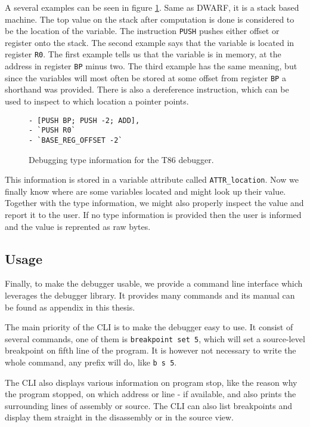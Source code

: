 A several examples can be seen in figure \ref{fig:t86dbg-vm}. Same as DWARF, it
is a stack based machine. The top value on the stack after computation is done
is considered to be the location of the variable. The instruction \texttt{PUSH}
pushes either offset or register onto the stack. The second example says that
the variable is located in register \texttt{R0}. The first example tells us
that the variable is in memory, at the address in register \texttt{BP} minus
two. The third example has the same meaning, but since the variables will
most often be stored at some offset from register \texttt{BP} a shorthand
was provided. There is also a dereference instruction, which can be used
to inspect to which location a pointer points.

\begin{figure}
    \begin{lstlisting}
- [PUSH BP; PUSH -2; ADD],
- `PUSH R0`
- `BASE_REG_OFFSET -2`
    \end{lstlisting}
    \caption{Debugging type information for the T86 debugger.}
    \label{fig:t86dbg-vm}
\end{figure}

This information is stored in a variable attribute called
\texttt{ATTR\_location}. Now we finally know where are some variables located
and might look up their value. Together with the type information, we might
also properly inspect the value and report it to the user. If no type
information is provided then the user is informed and the value is reprented as
raw bytes.

\subsection{Usage}
Finally, to make the debugger usable, we provide a command line interface which
leverages the debugger library. It provides many commands and its manual can be
found as appendix in this thesis.

The main priority of the CLI is to make the debugger easy to use. It consist of
several commands, one of them is \texttt{breakpoint set 5}, which will set a
source-level breakpoint on fifth line of the program. It is however not
necessary to write the whole command, any prefix will do, like \texttt{b s 5}.

The CLI also displays various information on program stop, like the reason why
the program stopped, on which address or line - if available, and also prints
the surrounding lines of assembly or source. The CLI can also list breakpoints
and display them straight in the disassembly or in the source view.

